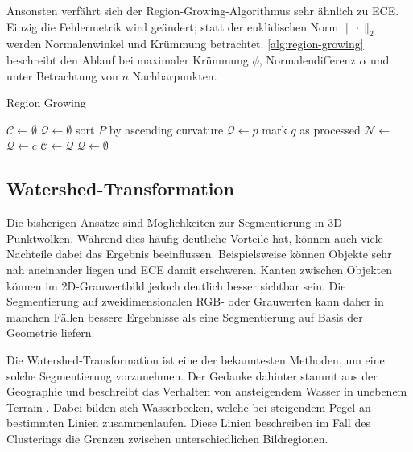 Ansonsten verfährt sich der Region-Growing-Algorithmus sehr ähnlich zu \ac{ECE}.
Einzig die Fehlermetrik wird geändert; statt der euklidischen Norm $\|\cdot\|_2$ werden Normalenwinkel und Krümmung betrachtet.
\autoref{alg:region-growing} beschreibt den Ablauf bei maximaler Krümmung $\phi$, Normalendifferenz $\alpha$ und unter Betrachtung von $n$ Nachbarpunkten.

\begin{algorithm}
\caption{Region Growing}
\label{alg:region-growing}
\begin{algorithmic}
\State $\mathcal{C} \gets \emptyset$
\State $\mathcal{Q} \gets \emptyset$
\State sort $P$ by ascending curvature
	\State $\mathcal{Q} \gets p$
		\State mark $q$ as processed
		\State $\mathcal{N} \gets$ 
				\State $\mathcal{Q} \gets c$
			\EndIf
		\EndFor
	\EndFor
	\State $\mathcal{C} \gets \mathcal{Q}$
	\State $\mathcal{Q} \gets \emptyset$
\EndFor
\State {}
\end{algorithmic}
\end{algorithm}


\subsection{Watershed-Transformation}
\label{subsec:watershed}

Die bisherigen Ansätze sind Möglichkeiten zur Segmentierung in 3D-Punktwolken.
Während dies häufig deutliche Vorteile hat, können auch viele Nachteile dabei das Ergebnis beeinflussen.
Beispielsweise können Objekte sehr nah aneinander liegen und \ac{ECE} damit erschweren.
Kanten zwischen Objekten können im 2D-Grauwertbild jedoch deutlich besser sichtbar sein.
Die Segmentierung auf zweidimensionalen RGB- oder Grauwerten kann daher in manchen Fällen bessere Ergebnisse als eine Segmentierung auf Basis der Geometrie liefern.

Die Watershed-Transformation ist eine der bekanntesten Methoden, um eine solche Segmentierung vorzunehmen.
Der Gedanke dahinter stammt aus der Geographie und beschreibt das Verhalten von ansteigendem Wasser in unebenem Terrain \cite[1--2]{roerdink2000watershed}.
Dabei bilden sich Wasserbecken, welche bei steigendem Pegel an bestimmten Linien zusammenlaufen.
Diese Linien beschreiben im Fall des Clusterings die Grenzen zwischen unterschiedlichen Bildregionen.

